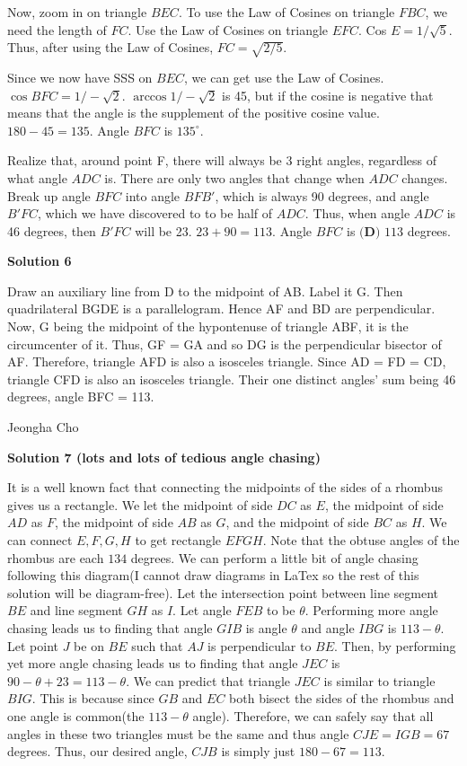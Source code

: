 \begin{enumerate}
 Now, zoom in on triangle $BEC$. To use the Law of Cosines on triangle $FBC$, we need the length of $FC$. Use the Law of Cosines on triangle $EFC$. Cos $E=1/\sqrt{5}$. Thus, after using the Law of Cosines, $FC=\sqrt{2/5}$. 

 Since we now have SSS on $BEC$, we can get use the Law of Cosines. $\cos BFC=1/-\sqrt{2}$. $\arccos 1/-\sqrt{2}$ is 45, but if the cosine is negative that means that the angle is the supplement of the positive cosine value. $180-45=135$. Angle $BFC$ is $135^\circ$. 

 Realize that, around point F, there will always be 3 right angles, regardless of what angle $ADC$ is. There are only two angles that change when $ADC$ changes. Break up angle $BFC$ into angle $BFB'$, which is always 90 degrees, and angle $B'FC$, which we have discovered to to be half of $ADC$. Thus, when angle $ADC$ is 46 degrees, then $B'FC$ will be 23. $23+90=113$. Angle $BFC$ is $\boxed{\textbf{(D) }113}$ degrees.

 



\textbf{Solution 6}

Draw an auxiliary line from D to the midpoint of AB. Label it G. Then quadrilateral BGDE is a parallelogram. Hence AF and BD are perpendicular. Now, G being the midpoint of the hypontenuse of triangle ABF, it is the circumcenter of it. Thus, GF = GA and so DG is the perpendicular bisector of AF. Therefore, triangle AFD is also a isosceles triangle. Since AD = FD = CD, triangle CFD is also an isosceles triangle. Their one distinct angles' sum being 46 degrees, angle BFC = 113.

 Jeongha Cho

 



\textbf{Solution 7 (lots and lots of tedious angle chasing)}

It is a well known fact that connecting the midpoints of the sides of a rhombus gives us a rectangle. We let the midpoint of side $DC$ as $E$, the midpoint of side $AD$ as $F$, the midpoint of side $AB$ as $G$, and the midpoint of side $BC$ as $H$. We can connect $E, F, G, H$ to get rectangle $EFGH$. Note that the obtuse angles of the rhombus are each $134$ degrees. We can perform a little bit of angle chasing following this diagram(I cannot draw diagrams in LaTex so the rest of this solution will be diagram-free). Let the intersection point between line segment $BE$ and line segment $GH$ as $I$. Let angle $FEB$ to be $\theta$. Performing more angle chasing leads us to finding that angle $GIB$ is angle $\theta$ and angle $IBG$ is $113 - \theta$. Let point $J$ be on $BE$ such that $AJ$ is perpendicular to $BE$. Then, by performing yet more angle chasing leads us to finding that angle $JEC$ is $90 - \theta + 23 = 113 - \theta$. We can predict that triangle $JEC$ is similar to triangle $BIG$. This is because since $GB$ and $EC$ both bisect the sides of the rhombus and one angle is common(the $113 - \theta$ angle). Therefore, we can safely say that all angles in these two triangles must be the same and thus angle $CJE = IGB = 67$ degrees. Thus, our desired angle, $CJB$ is simply just $180 - 67 = \boxed{113}$. 


\end{enumerate}
